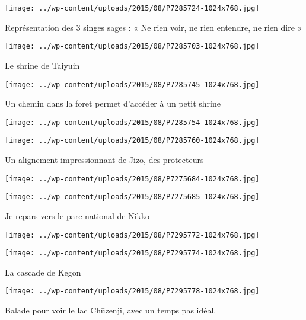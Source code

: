  \newline
\centerline{\texttt{[image: ../wp-content/uploads/2015/08/P7285724-1024x768.jpg]} } 
 \newline
 Représentation des 3 singes sages : « Ne rien voir, ne rien entendre, ne rien dire » \newline
 \newline
\centerline{\texttt{[image: ../wp-content/uploads/2015/08/P7285703-1024x768.jpg]} } 
 \newline
 Le shrine de Taiyuin \newline
 \newline
\centerline{\texttt{[image: ../wp-content/uploads/2015/08/P7285745-1024x768.jpg]} } 
 \newline
 Un chemin dans la foret permet d'accéder à un petit shrine \newline
 \newline
\centerline{\texttt{[image: ../wp-content/uploads/2015/08/P7285754-1024x768.jpg]} } 
 \newline
 \newline
\centerline{\texttt{[image: ../wp-content/uploads/2015/08/P7285760-1024x768.jpg]} } 
 \newline
 Un alignement impressionnant de Jizo, des protecteurs \newline
 \newline
\centerline{\texttt{[image: ../wp-content/uploads/2015/08/P7275684-1024x768.jpg]} } 
 \newline
 \newline
\centerline{\texttt{[image: ../wp-content/uploads/2015/08/P7275685-1024x768.jpg]} } 
 \newline
 Je repars vers le parc national de Nikko \newline
 \newline
\centerline{\texttt{[image: ../wp-content/uploads/2015/08/P7295772-1024x768.jpg]} } 
 \newline
 \newline
\centerline{\texttt{[image: ../wp-content/uploads/2015/08/P7295774-1024x768.jpg]} } 
 \newline
 La cascade de Kegon \newline
 \newline
\centerline{\texttt{[image: ../wp-content/uploads/2015/08/P7295778-1024x768.jpg]} } 
 \newline
 Balade pour voir le lac Chūzenji, avec un temps pas idéal. \newline
